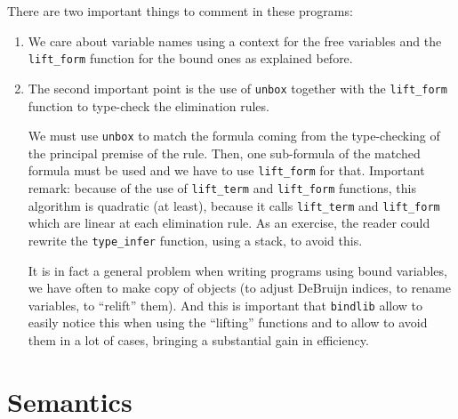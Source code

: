 \documentclass[11pt]{article}
\begin{document}
There are two important things to comment in these programs:
\begin{enumerate}
\item We care about variable names using a context for the free
  variables and the \verb#lift_form# function for the bound ones as explained
  before.

\item The second important point is the use of \verb#unbox# together
with the \verb#lift_form# function to type-check the elimination rules.

We must use \verb#unbox# to match the formula coming from the
type-checking of the principal premise of the rule. Then, one
sub-formula of the matched formula must be used and we have to use
\verb#lift_form# for that.
Important remark: because of the use of \verb#lift_term# and
\verb#lift_form# functions, this algorithm is quadratic (at least), because
it calls \verb#lift_term# and \verb#lift_form# which are linear at
each elimination rule. As an exercise, the reader could rewrite the
\verb#type_infer# function, using a stack, to avoid this.

It is in fact a general problem when writing programs using bound
variables, we have often to make copy of objects (to adjust DeBruijn
indices, to rename variables, to ``relift'' them). And this is
important that \verb#bindlib# allow to easily notice this when using
the ``lifting'' functions and to allow to avoid them in a lot of cases,
bringing a substantial gain in efficiency.
\end{enumerate}

\section{Semantics}
\end{document}
